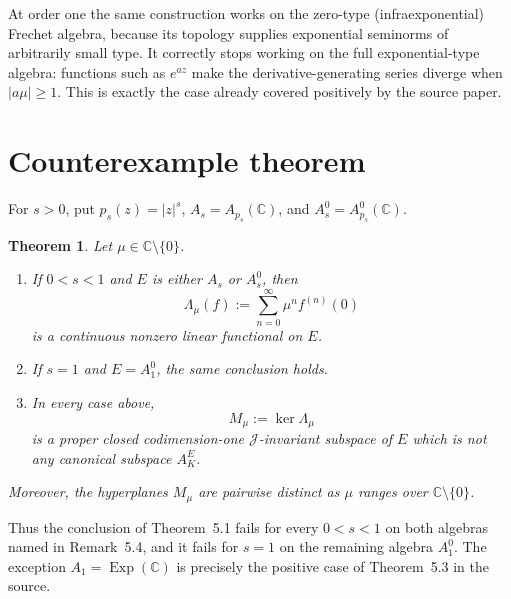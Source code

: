 \documentclass[11pt]{article}
\newtheorem{theorem}{Theorem}
\newcommand{\C}{\mathbb C}
\newcommand{\J}{\mathcal J}
\newcommand{\Lam}{\Lambda}
\begin{document}
At order one the same construction works on the zero-type (infraexponential) Frechet algebra, because its topology supplies exponential seminorms of arbitrarily small type. It correctly stops working on the full exponential-type algebra: functions such as $e^{az}$ make the derivative-generating series diverge when $|a\mu|\geq1$. This is exactly the case already covered positively by the source paper.

\section{Counterexample theorem}

For $s>0$, put $p_s(z)=|z|^s$, $A_s=A_{p_s}(\C)$, and $A_s^0=A_{p_s}^0(\C)$.

\begin{theorem}\label{thm:main}
Let $\mu\in\C\setminus\{0\}$.
\begin{enumerate}[label=\textup{(\roman*)}]
  \item If $0<s<1$ and $E$ is either $A_s$ or $A_s^0$, then
  \[
    \Lam_\mu(f):=\sum_{n=0}^\infty \mu^n f^{(n)}(0)
  \]
  is a continuous nonzero linear functional on $E$.
  \item If $s=1$ and $E=A_1^0$, the same conclusion holds.
  \item In every case above,
  \[
    M_\mu:=\ker\Lam_\mu
  \]
  is a proper closed codimension-one $\J$-invariant subspace of $E$ which is not any canonical subspace $A_K^E$.
\end{enumerate}
Moreover, the hyperplanes $M_\mu$ are pairwise distinct as $\mu$ ranges over $\C\setminus\{0\}$.
\end{theorem}

Thus the conclusion of Theorem~5.1 fails for every $0<s<1$ on both algebras named in Remark~5.4, and it fails for $s=1$ on the remaining algebra $A_1^0$. The exception $A_1=\operatorname{Exp}(\C)$ is precisely the positive case of Theorem~5.3 in the source.
\end{document}
